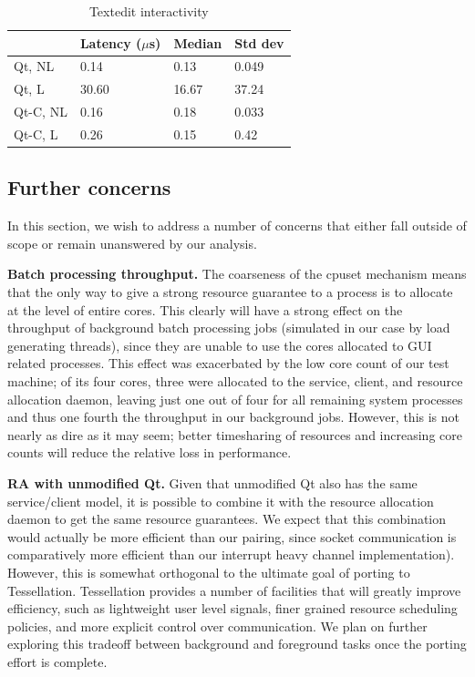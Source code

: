 \documentclass[letterpaper,twocolumn,11pt]{article}
\begin{document}
\begin{table}[htp]
\caption{Textedit interactivity}
\label{tab:textedit_table}
\centering
\begin{tabular}{|l | l | l | l |}
\hline
	&Latency ($\mu$s)	&Median	&Std dev\\ \hline
Qt, NL	&0.14	&0.13	&0.049\\
Qt, L	&30.60	&16.67	&37.24\\
Qt-C, NL	&0.16	&0.18	&0.033\\
Qt-C, L	&0.26	&0.15	&0.42\\
\hline
\end{tabular}
\end{table}

\subsection{Further concerns}

In this section, we wish to address a number of concerns that either fall outside of scope or remain unanswered by our analysis.

\textbf{Batch processing throughput.} The coarseness of the cpuset mechanism means that the only way to give a strong resource guarantee to a process is to allocate at the level of entire cores. This clearly will have a strong effect on the throughput of background batch processing jobs (simulated in our case by load generating threads), since they are unable to use the cores allocated to GUI related processes. This effect was exacerbated by the low core count of our test machine; of its four cores, three were allocated to the service, client, and resource allocation daemon, leaving just one out of four for all remaining system processes and thus one fourth the throughput in our background jobs. However, this is not nearly as dire as it may seem; better timesharing of resources and increasing core counts will reduce the relative loss in performance.

\textbf{RA with unmodified Qt.} Given that unmodified Qt also has the same service/client model, it is possible to combine it with the resource allocation daemon to get the same resource guarantees. We expect that this combination would actually be more efficient than our pairing, since socket communication is comparatively more efficient than our interrupt heavy channel implementation). However, this is somewhat orthogonal to the ultimate goal of porting to Tessellation. Tessellation provides a number of facilities that will greatly improve efficiency, such as lightweight user level signals, finer grained resource scheduling policies, and more explicit control over communication. We plan on further exploring this tradeoff between background and foreground tasks once the porting effort is complete.
\end{document}
